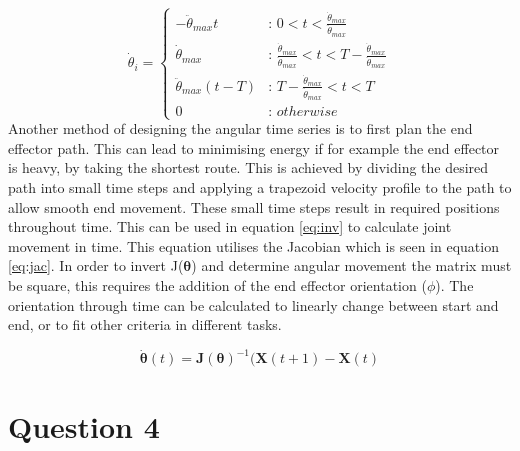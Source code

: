 \documentclass[twoside,twocolumn]{article}
\newcommand{\threepartdef}[6]
{
	\left\{
		\begin{array}{lll}
			#1 & \mbox{: } #2 \\
			#3 & \mbox{: } #4 \\
			#5 & \mbox{: } #6 \\
			0 & \mbox{: } otherwise
		\end{array}
	\right.
}
\begin{document}
\begin{equation}
\dot{\theta}_i = \threepartdef
{-\ddot{\theta}_{max}t     } 
{0<t<\frac{\dot{\theta}_{max}}{\ddot{\theta}_{max}}}
{\dot{\theta}_{max}}   
{
\frac{\dot{\theta}_{max}}{\ddot{\theta}_{max}} < t < T-\frac{\dot{\theta}_{max}}{\ddot{\theta}_{max}}}
{\ddot{\theta}_{max}(t-T) } 
{T-\frac{\dot{\theta}_{max}}{\ddot{\theta}_{max}}< t < T}
\label{eq:vpro}
\end{equation}
\newline
Another method of designing the angular time series is to first plan the end effector path. This can lead to minimising energy if for example the end effector is heavy, by taking the shortest route. This is achieved by dividing the desired path into small time steps and applying a trapezoid velocity profile to the path to allow smooth end movement. These small time steps result in required positions throughout time. This can be used in equation \ref{eq:inv} to calculate joint movement in time. This equation utilises the Jacobian which is seen in equation \ref{eq:jac}. In order to invert J($\boldsymbol{\theta}$) and determine angular movement the matrix must be square, this requires the addition of the end effector orientation ($\phi$). The orientation through time can be calculated to linearly change between start and end, or to fit other criteria in different tasks. 

\begin{equation}
\boldsymbol{\dot{\theta}}(t)=\boldsymbol{J(\theta)}^{-1}(\textbf{X}(t+1)-\textbf{X}(t)
\label{eq:inv}
\end{equation}




\section{Question 4}
\end{document}
